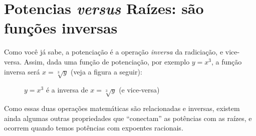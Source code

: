 \documentclass[pdftex, brazil, 12pt, oneside]{article}
\begin{document}
\section{Potencias \emph{versus} Raízes: são funções inversas}
\label{potrad}

Como você já sabe, a potenciação é a operação \emph{inversa} da
radiciação, e vice-versa. Assim, dada uma função de potenciação, por
exemplo $y = x^3$, a função inversa será $x = \sqrt[3]{y}$ (veja a
figura a seguir):

\begin{figure}[H]
  \begin{center}
    \caption{$y=x^3$ é a inversa de $x=\sqrt[3]{y}$ (e vice-versa)}
    \label{fig:pot-rad-inv}
  \end{center}
\end{figure}

Como essas duas operações matemáticas são relacionadas e inversas,
existem ainda algumas outras propriedades que ``conectam'' as
potências com as raízes, e ocorrem quando temos potências com
expoentes racionais.


\end{document}
